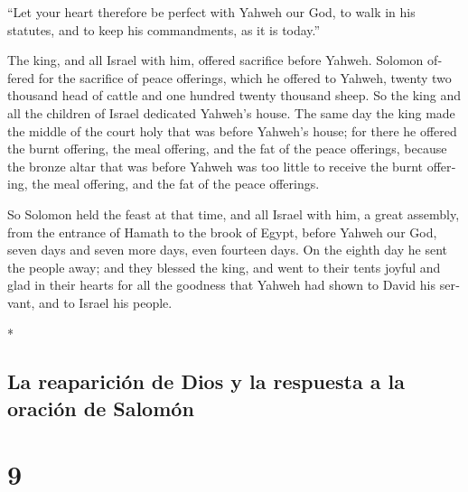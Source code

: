 \begin{paracol}{2}
\begin{otherlanguage}{english}
 ``Let your heart therefore be perfect with Yahweh our
God, to walk in his statutes, and to keep his commandments, as it is
today.''

 The king, and all Israel with him, offered sacrifice
before Yahweh.  Solomon offered for the sacrifice of
peace offerings, which he offered to Yahweh, twenty two thousand head of
cattle and one hundred twenty thousand sheep. So the king and all the
children of Israel dedicated Yahweh's house.  The same
day the king made the middle of the court holy that was before Yahweh's
house; for there he offered the burnt offering, the meal offering, and
the fat of the peace offerings, because the bronze altar that was before
Yahweh was too little to receive the burnt offering, the meal offering,
and the fat of the peace offerings.

 So Solomon held the feast at that time, and all Israel
with him, a great assembly, from the entrance of Hamath to the brook of
Egypt, before Yahweh our God, seven days and seven more days, even
fourteen days.  On the eighth day he sent the people
away; and they blessed the king, and went to their tents joyful and glad
in their hearts for all the goodness that Yahweh had shown to David his
servant, and to Israel his people.

\end{otherlanguage}

\switchcolumn[0]*

\hypertarget{la-reapariciuxf3n-de-dios-y-la-respuesta-a-la-oraciuxf3n-de-salomuxf3n}{%
\subsection{La reaparición de Dios y la respuesta a la oración de
Salomón}\label{la-reapariciuxf3n-de-dios-y-la-respuesta-a-la-oraciuxf3n-de-salomuxf3n}}

\hypertarget{section-16}{%
\section{9}\label{section-16}}


\end{paracol}
